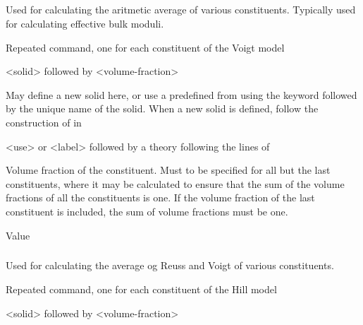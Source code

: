 {\subparagraph{}
 \slist
   \item \Description Used for calculating the aritmetic average of various constituents. Typically used for calculating effective bulk moduli. 
   \item \Argument
   \item \Default 
 \elist

 \slist
   \item \Description Repeated command, one for each constituent of the Voigt model
   \item \Argument <solid> followed by <volume-fraction>
   \item \Default
 \elist

 \slist
   \item \Description May define a new solid here, or use a predefined  from  using the keyword  followed by the unique name of the solid. When a new solid is defined, follow the construction of  in 
   \item \Argument <use> or <label> followed by a theory following the lines of 
   \item \Default
 \elist

 \slist
   \item \Description Volume fraction of the constituent. Must to be specified for all but the last constituents, where it may be calculated to ensure that the sum of the volume fractions of all the constituents is one. If the volume fraction of the last constituent is included, the sum of volume fractions must be one. 
   \item \Argument Value
   \item \Default
 \elist

\subparagraph{}
 \slist
   \item \Description Used for calculating the average og Reuss and Voigt of various constituents.
   \item \Argument
   \item \Default 
 \elist

 \slist
   \item \Description Repeated command, one for each constituent of the Hill model
   \item \Argument <solid> followed by <volume-fraction>
   \item \Default
 \elist

}
